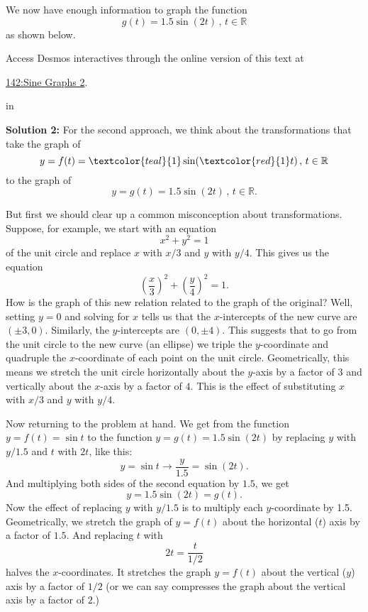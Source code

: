 \documentclass{ximera}
\newcommand{\pskip}{\vskip 0.1 in}
\begin{document}
\begin{example}
We now have enough information to graph the function 
\[
    g(t) = 1.5 \sin (2t) \, , \, t \in \mathbb{R} 
\]
as shown below.

Access Desmos interactives through the online version of this text at
 
\href{https://www.desmos.com/calculator/txuiehcciu}{142:Sine Graphs 2}.

 
\begin{onlineOnly}
    \begin{center}
\end{center}
\end{onlineOnly}

\pskip

{\bf Solution 2:} For the second approach, we think about the transformations that take the graph of 
\[
      y = f(t) = \textcolor{teal}{1} \sin (\textcolor{red}{1}t) \, , \, t\in \mathbb{R}
\]
to the graph of
\[
  y = g(t) = 1.5 \sin (2t) \, , \, t\in \mathbb{R} .
\]

But first we should clear up a common misconception about transformations. Suppose, for example, we start with an equation 
\[
   x^2 + y^2 = 1
\]
of the unit circle and replace $x$ with $x/3$ and $y$ with $y/4$. This gives us the equation
\[
    \left( \frac{x}{3} \right)^2 + \left( \frac{y}{4} \right)^2 = 1 .
\]
How is the graph of this new relation related to the graph of the original? Well, setting $y=0$ and solving for $x$ tells us that the $x$-intercepts of the new curve are $(\pm 3, 0)$. Similarly, the $y$-intercepts are $(0,\pm 4)$. This suggests that to go from the unit circle to the new curve (an ellipse) we triple the $y$-coordinate and quadruple the $x$-coordinate of each point on the unit circle. Geometrically, this means we stretch the unit circle horizontally about the $y$-axis by a factor of $3$ and vertically about the $x$-axis by a factor of $4$. This is the effect of substituting $x$ with $x/3$ and $y$ with $y/4$.

Now returning to the problem at hand. We get from the function $y=f(t) = \sin t$ to the function $y=g(t) = 1.5 \sin (2t)$ by replacing $y$ with $y/1.5$ and $t$ with $2t$, like this: 
\[
   y = \sin t  \longrightarrow \frac{y}{1.5} = \sin (2t) .
\]
And multiplying both sides of the second equation by $1.5$, we get
\[
        y = 1.5 \sin (2t) = g(t) .
\]
Now the effect of replacing $y$ with $y/1.5$ is to multiply each $y$-coordinate by 1.5. Geometrically, we stretch the graph of $y=f(t)$ about the horizontal ($t$) axis by a factor of $1.5$. And replacing $t$ with 
\[
   2t = \frac{t}{1/2}
\]
halves the $x$-coordinates. It stretches the graph $y=f(t)$ about the vertical ($y$) axis by a factor of $1/2$ (or we can say compresses the graph about the vertical axis by a factor of $2$.)


\end{example}
\end{document}
